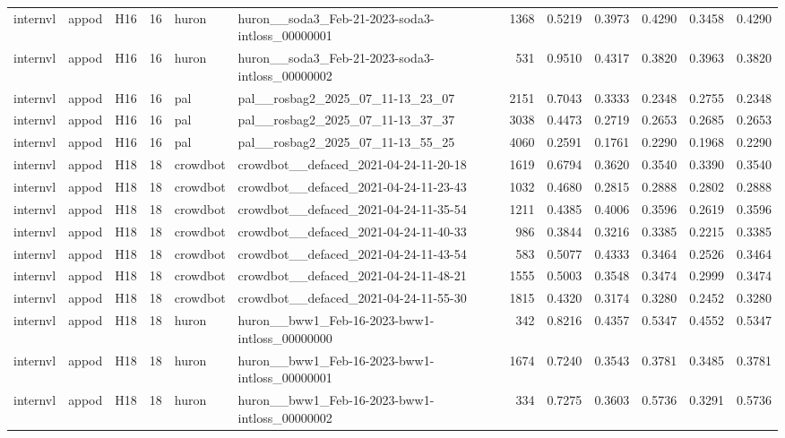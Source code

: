 \begin{table}[tbp]
\begin{tabular}{lllrllrrrrrr}
internvl & appod & H16 & 16 & huron & huron\_\_soda3\_Feb-21-2023-soda3-intloss\_00000001 & 1368 & 0.5219 & 0.3973 & 0.4290 & 0.3458 & 0.4290 \\
internvl & appod & H16 & 16 & huron & huron\_\_soda3\_Feb-21-2023-soda3-intloss\_00000002 & 531 & 0.9510 & 0.4317 & 0.3820 & 0.3963 & 0.3820 \\
internvl & appod & H16 & 16 & pal & pal\_\_rosbag2\_2025\_07\_11-13\_23\_07 & 2151 & 0.7043 & 0.3333 & 0.2348 & 0.2755 & 0.2348 \\
internvl & appod & H16 & 16 & pal & pal\_\_rosbag2\_2025\_07\_11-13\_37\_37 & 3038 & 0.4473 & 0.2719 & 0.2653 & 0.2685 & 0.2653 \\
internvl & appod & H16 & 16 & pal & pal\_\_rosbag2\_2025\_07\_11-13\_55\_25 & 4060 & 0.2591 & 0.1761 & 0.2290 & 0.1968 & 0.2290 \\
internvl & appod & H18 & 18 & crowdbot & crowdbot\_\_defaced\_2021-04-24-11-20-18 & 1619 & 0.6794 & 0.3620 & 0.3540 & 0.3390 & 0.3540 \\
internvl & appod & H18 & 18 & crowdbot & crowdbot\_\_defaced\_2021-04-24-11-23-43 & 1032 & 0.4680 & 0.2815 & 0.2888 & 0.2802 & 0.2888 \\
internvl & appod & H18 & 18 & crowdbot & crowdbot\_\_defaced\_2021-04-24-11-35-54 & 1211 & 0.4385 & 0.4006 & 0.3596 & 0.2619 & 0.3596 \\
internvl & appod & H18 & 18 & crowdbot & crowdbot\_\_defaced\_2021-04-24-11-40-33 & 986 & 0.3844 & 0.3216 & 0.3385 & 0.2215 & 0.3385 \\
internvl & appod & H18 & 18 & crowdbot & crowdbot\_\_defaced\_2021-04-24-11-43-54 & 583 & 0.5077 & 0.4333 & 0.3464 & 0.2526 & 0.3464 \\
internvl & appod & H18 & 18 & crowdbot & crowdbot\_\_defaced\_2021-04-24-11-48-21 & 1555 & 0.5003 & 0.3548 & 0.3474 & 0.2999 & 0.3474 \\
internvl & appod & H18 & 18 & crowdbot & crowdbot\_\_defaced\_2021-04-24-11-55-30 & 1815 & 0.4320 & 0.3174 & 0.3280 & 0.2452 & 0.3280 \\
internvl & appod & H18 & 18 & huron & huron\_\_bww1\_Feb-16-2023-bww1-intloss\_00000000 & 342 & 0.8216 & 0.4357 & 0.5347 & 0.4552 & 0.5347 \\
internvl & appod & H18 & 18 & huron & huron\_\_bww1\_Feb-16-2023-bww1-intloss\_00000001 & 1674 & 0.7240 & 0.3543 & 0.3781 & 0.3485 & 0.3781 \\
internvl & appod & H18 & 18 & huron & huron\_\_bww1\_Feb-16-2023-bww1-intloss\_00000002 & 334 & 0.7275 & 0.3603 & 0.5736 & 0.3291 & 0.5736 \\

\end{tabular}
\end{table}
